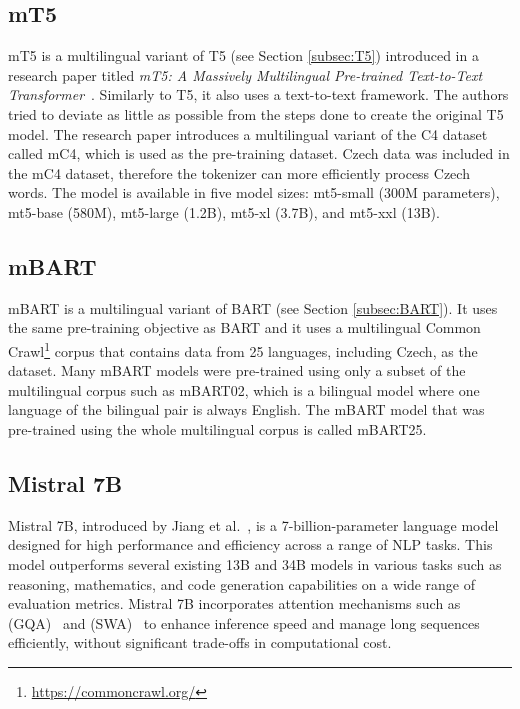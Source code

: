 \documentclass[english, ba, kiv, he, iso690numb, pdf, viewonly]{fasthesis}
\begin{document}
\subsection{mT5}
mT5 is a multilingual variant of T5 (see Section \ref{subsec:T5}) introduced in a research paper titled \textit{mT5: A Massively Multilingual Pre-trained Text-to-Text Transformer}~\cite{xue-etal-2021-mt5}. Similarly to T5, it also uses a text-to-text framework. The authors tried to deviate as little as possible from the steps done to create the original T5 model. The research paper introduces a multilingual variant of the C4 dataset called mC4, which is used as the pre-training dataset. Czech data was included in the mC4 dataset, therefore the tokenizer can more efficiently process Czech words.
The model is available in five model sizes: mt5-small (300M parameters), mt5-base (580M), mt5-large (1.2B), mt5-xl (3.7B), and mt5-xxl (13B).

\subsection{mBART}
mBART is a multilingual variant of BART (see Section \ref{subsec:BART}). It uses the same pre-training objective as BART and it uses a multilingual Common Crawl\footnote{\url{https://commoncrawl.org/}} corpus that contains data from 25 languages, including Czech, as the dataset. Many mBART models were pre-trained using only a subset of the multilingual corpus such as mBART02, which is a bilingual model where one language of the bilingual pair is always English. The mBART model that was pre-trained using the whole multilingual corpus is called mBART25.

\subsection{Mistral 7B}
Mistral 7B, introduced by Jiang et al.~\cite{jiang2023mistral}, is a 7-billion-parameter language model designed for high performance and efficiency across a range of NLP tasks. This model outperforms several existing 13B and 34B models in various tasks such as reasoning, mathematics, and code generation capabilities on a wide range of evaluation metrics. Mistral 7B incorporates attention mechanisms such as  (GQA)~\cite{ainslie2023gqa} and  (SWA)~\cite{beltagy2020longformer} to enhance inference speed and manage long sequences efficiently, without significant trade-offs in computational cost. 
\end{document}
